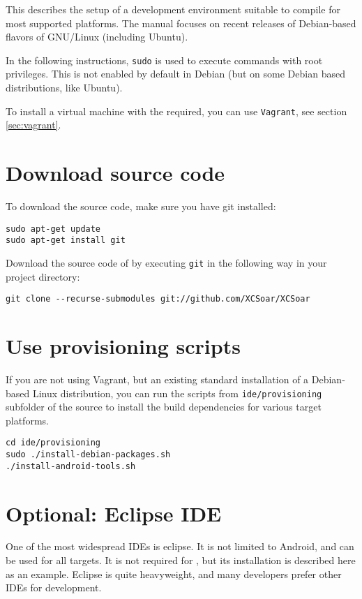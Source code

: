 This describes the setup of a development environment suitable to compile \xc
for most supported platforms. The manual focuses on recent releases of
Debian-based flavors of GNU/Linux (including Ubuntu).

In the following instructions, \texttt{sudo} is used to execute commands with
root privileges. This is not enabled by default in Debian (but on some Debian
based distributions, like Ubuntu).

To install a virtual machine with the required, you can use \texttt{Vagrant},
see section \ref{sec:vagrant}.

\section{Download source code}
To download the \xc source code, make sure you have git installed:
\begin{verbatim}
sudo apt-get update
sudo apt-get install git
\end{verbatim}

Download the source code of \xc by executing \texttt{git} in the following way in
your project directory:
\begin{verbatim}
git clone --recurse-submodules git://github.com/XCSoar/XCSoar
\end{verbatim}

\section{Use provisioning scripts}
If you are not using Vagrant, but an existing standard installation of a
Debian-based Linux distribution, you can run the scripts from
\texttt{ide/provisioning} subfolder of the \xc source to install the build
dependencies for various \xc target platforms.

\begin{verbatim}
cd ide/provisioning
sudo ./install-debian-packages.sh
./install-android-tools.sh
\end{verbatim}

\section{Optional: Eclipse IDE}
One of the most widespread IDEs is eclipse. It is not limited to Android, and can be used for all targets. It is not required for \xc, but its installation is described here as an example. Eclipse is quite heavyweight, and many developers prefer other IDEs for \xc development.

